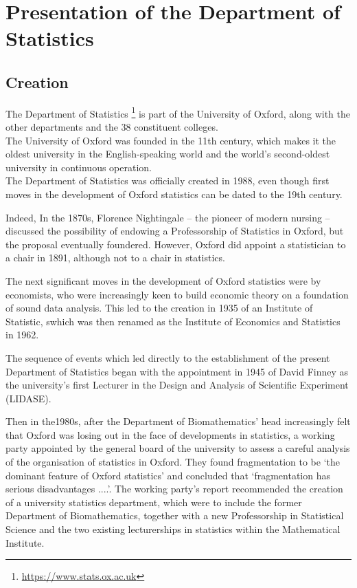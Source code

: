 \chapter{Presentation of the Department of Statistics}


\section{Creation}
\quad The Department of Statistics \footnote{\url{https://www.stats.ox.ac.uk}} is part of the University of Oxford, along with the other departments and the 38 constituent colleges. \\

The University of Oxford was founded in the 11th century, which makes it the oldest university in the English-speaking world and the world's second-oldest university in continuous operation. \\

The Department of Statistics was officially created in 1988, even though first moves in the development of Oxford statistics can be dated to the 19th century.

Indeed, In the 1870s, Florence Nightingale -- the pioneer of modern nursing -- discussed the possibility of endowing a Professorship of Statistics in Oxford, but the proposal eventually foundered.
However, Oxford did appoint a statistician to a chair in 1891, although not to a chair in statistics.

The next significant moves in the development of Oxford statistics were by economists, who were increasingly keen to build economic theory on a foundation of sound data analysis.
This led to the creation in 1935 of an Institute of Statistic, swhich was then renamed as the Institute of Economics and Statistics in 1962. 

The sequence of events which led directly to the establishment of the present Department of Statistics began with the appointment in 1945 of David Finney as the university’s first Lecturer in the Design and Analysis of Scientific Experiment (LIDASE).

Then in  the1980s, after the Department of Biomathematics' head increasingly felt that Oxford was losing out in the face of developments in statistics, a working party appointed by the general board of the university to assess a careful analysis of the organisation of statistics in Oxford. 
They found fragmentation to be ‘the dominant feature of Oxford statistics’ and concluded that ‘fragmentation has serious disadvantages ....’.
The working party’s report recommended the creation of a university statistics department, which were to include the former Department of Biomathematics, together with a new Professorship in Statistical Science and the two existing lecturerships in statistics within the Mathematical Institute.

